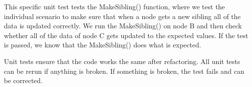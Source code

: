 This specific unit test tests the MakeSibling() function, where we test the individual scenario to make sure that when a node gets a new sibling all of the data is updated correctly. We run the MakeSibling() on node B and then check whether all of the data of node C gets updated to the expected values. If the test is passed, we know that the MakeSibling() does what is expected. 

Unit tests ensure that the code works the same after refactoring. All unit tests can be rerun if anything is broken. If something is broken, the test fails and can be corrected.
